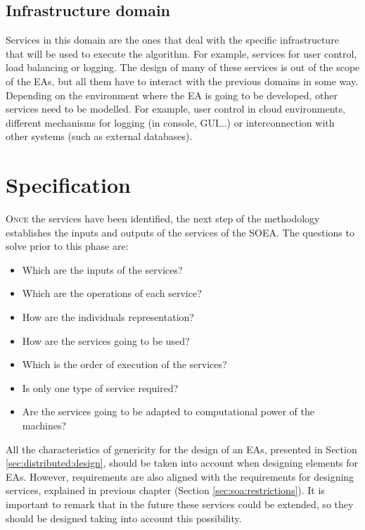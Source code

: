 \subsection{Infrastructure domain} Services in this domain are the ones that deal with the specific infrastructure that will be used to execute the algorithm. For example, services for user control, load balancing or logging. The design of many of these services is out of the scope of the EAs, but all them have to interact with the previous domains in some way. Depending on the environment where the EA is going to be developed, other services need to be modelled. For example, user control in cloud environments, different mechanisms for logging (in console, GUI...) or interconnection with other systems (such as external databases).

 

\section{Specification}

\lettrine{O}{nce} the services have been identified, the next step of the methodology establishes the inputs and outputs of the services of the SOEA. The questions to solve prior to this phase are:

\begin{itemize}
\item Which are the inputs of the services?
\item Which are the operations of each service?
\item How are the individuals representation?
\item How are the services going to be used?
\item Which is the order of execution of the services?
\item Is only one type of service required?
\item Are the services going to be adapted to computational power of the machines?
\end{itemize}

All the characteristics of genericity for the design of an EAs, presented in Section \ref{sec:distributed:design}, should be taken into account when designing elements for EAs. However, requirements are also aligned with the requirements for designing services, explained in previous chapter (Section \ref{sec:soa:restrictions}). It is important to remark that in the future these services could be extended, so they should be designed taking into account this possibility.



